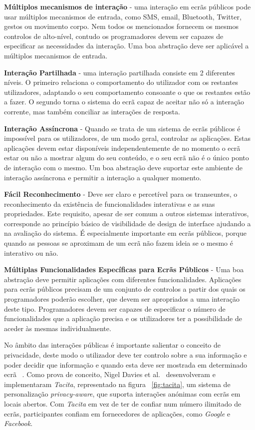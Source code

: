 \textbf{Múltiplos mecanismos de interação} - uma interação em ecrãs públicos pode usar múltiplos mecanismos de entrada, como SMS, email, Bluetooth, Twitter, gestos ou movimento corpo. Nem todos os mencionados fornecem os mesmos controlos de alto-nível, contudo os programadores devem ser capazes de especificar as necessidades da interação. Uma boa abstração deve ser aplicável a múltiplos mecanismos de entrada.

\textbf{Interação Partilhada} - uma interação partilhada consiste em 2 diferentes níveis. O primeiro relaciona o comportamento do utilizador com os restantes utilizadores, adaptando o seu comportamento consoante o que os restantes estão a fazer. O segundo torna o sistema do ecrã capaz de aceitar não só a interação corrente, mas também conciliar as interações de resposta.

\textbf{Interação Assíncrona} - Quando se trata de um sistema de ecrãs públicos é impossível para os utilizadores, de um modo geral, controlar as aplicações. Estas aplicações devem estar disponíveis independentemente de no momento o ecrã estar ou não a mostrar algum do seu conteúdo, e o seu ecrã não é o único ponto de interação com o mesmo. Um boa abstração deve suportar este ambiente de interação assíncrona e permitir a interação a qualquer momento.

\textbf{Fácil Reconhecimento} - Deve ser claro e percetível para os transeuntes, o reconhecimento da existência de funcionalidades interativas e as suas propriedades. Este requisito, apesar de ser comum a outros sistemas interativos, corresponde ao princípio básico de visibilidade de design de interface ajudando a na avaliação do sistema. É especialmente importante em ecrãs públicos, porque quando as pessoas se aproximam de um ecrã não fazem ideia se o mesmo é interativo ou não.

\textbf{Múltiplas Funcionalidades Específicas para Ecrãs Públicos} - Uma boa abstração deve permitir aplicações com diferentes funcionalidades. Aplicações para ecrãs públicos precisam de um conjunto de controlos a partir dos quais os programadores poderão escolher, que devem ser apropriados a uma interação deste tipo. Programadores devem ser capazes de especificar o número de funcionalidades que a aplicação precisa e os utilizadores ter a possibilidade de aceder às mesmas individualmente.

No âmbito das interações públicas é importante salientar o conceito de privacidade, deste modo o utilizador deve ter controlo sobre a sua informação e poder decidir que informação e quando esta deve ser mostrada em determinado ecrã ~\cite{Davies2012b}. Como prova de conceito, Nigel Davies et al.~\cite{Davies2012b} desenvolveram e implementaram \textit{Tacita}, representado na figura ~\ref{fig:tacita}, um sistema de personalização \textit{privacy-aware}, que suporta interações anónimas com ecrãs em locais abertos. Com \textit{Tacita} em vez de ter de confiar num número ilimitado de ecrãs, participantes confiam em fornecedores de aplicações, como \textit{Google} e \textit{Facebook}.

